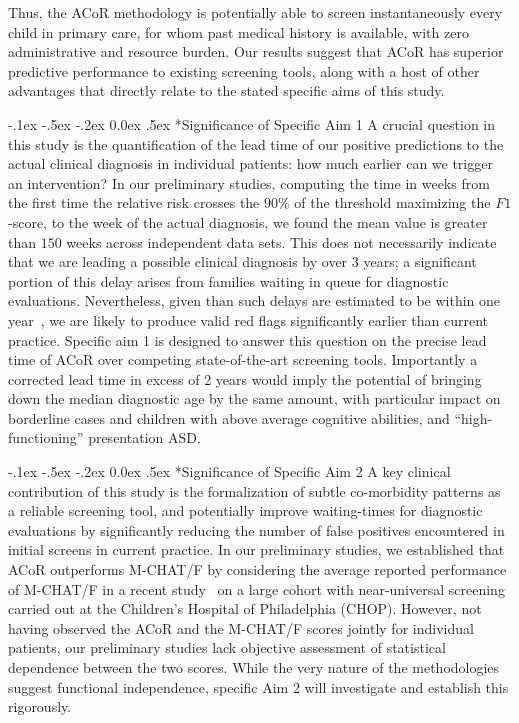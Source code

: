 \documentclass[onecolumn, compsoc,11pt]{IEEEtran}
\makeatletter
\renewcommand\paragraph{\@startsection {section}{1}{\z@}%
                                   {-.1ex \@plus -.5ex \@minus -.2ex}%
                                   {0.0ex \@plus.5ex}%
                                   {\fontsize{11}{10}\selectfont\bfseries\itshape\sffamily\color{black}}}
\def\ZERO{ACoR\xspace}
\makeatother
\begin{document}
Thus, the \ZERO methodology is potentially able to screen instantaneously   every child  in primary care, for whom past medical history is available, with zero administrative and resource burden.
Our results suggest that \ZERO  has superior predictive performance to existing screening tools, along with a host of other advantages that directly relate to the stated specific aims of this study. 

\paragraph*{Significance of Specific Aim 1} 
A  crucial question in this study is the quantification of  the lead time  of our positive predictions   to the actual clinical diagnosis in individual patients: how much earlier can we trigger an intervention? In our preliminary studies, computing the time in weeks from the first time the relative risk crosses the $90\%$ of the  threshold maximizing the $F1$-score, to the week of the actual diagnosis, we found the mean value is greater than $150$ weeks across independent data sets.  This does not necessarily indicate that we are   leading a possible clinical diagnosis by over $3$ years; a significant portion of this delay arises from families waiting in queue for diagnostic evaluations. Nevertheless, given than such delays are estimated to be within  one year~\cite{gordon2016whittling},  we are likely to produce valid red flags significantly earlier than current practice. Specific aim 1 is designed to answer this question on the precise lead time of \ZERO over competing state-of-the-art screening tools. Importantly a corrected lead time in excess of 2 years would imply the potential of bringing down the median diagnostic age by the same amount, with particular impact on borderline cases and children with above average cognitive abilities, and ``high-functioning'' presentation ASD.

\paragraph*{Significance of Specific Aim 2} A key clinical  contribution of this study is the formalization  of subtle co-morbidity patterns as a reliable screening tool, and potentially  improve waiting-times for diagnostic evaluations by significantly reducing the number of false positives encountered in initial screens in current practice. In our preliminary studies, we established that \ZERO outperforms M-CHAT/F by considering the average reported performance of M-CHAT/F in a recent study~\cite{pmid31562252} on a large  cohort with near-universal screening carried out at the Children's Hospital of Philadelphia (CHOP). However, not having observed the \ZERO and the M-CHAT/F scores jointly for individual patients, our preliminary studies lack objective assessment of statistical dependence between the two scores. While the very nature of the methodologies  suggest functional independence, specific Aim 2 will investigate and establish this rigorously. 
\end{document}
